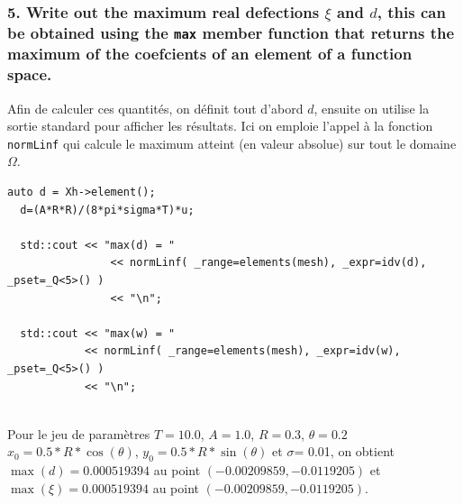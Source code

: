 \documentclass[a4paper,oneside,10pt]{report}
\begin{document}
\subsubsection{5. Write out the maximum real defections $\xi$ and $d$, this can be obtained using the \texttt{max} member function that
returns the maximum of the coefcients of an element of a function space.}

Afin de calculer ces quantités, on définit tout d'abord $d$, ensuite on utilise la sortie standard pour afficher les résultats. Ici on emploie l'appel à la fonction \texttt{normLinf} qui calcule le maximum atteint (en valeur absolue) sur tout le domaine $\Omega$.

\begin{center}
\begin{minipage}{\textwidth}
\begin{lstlisting}[label=code2,caption=membrane.cpp - definition de d]
  auto d = Xh->element();
  d=(A*R*R)/(8*pi*sigma*T)*u;

  std::cout << "max(d) = "
                << normLinf( _range=elements(mesh), _expr=idv(d), _pset=_Q<5>() )
                << "\n";
                
  std::cout << "max(w) = "
            << normLinf( _range=elements(mesh), _expr=idv(w), _pset=_Q<5>() )
            << "\n";  
      
\end{lstlisting}
\end{minipage}
\end{center}

Pour le jeu de paramètres $T=10.0$, $A = 1.0$, $R = 0.3$, $\theta = 0.2$ $x_0 = 0.5*R*\cos(\theta)$, $y_0 = 0.5*R*\sin(\theta)$ et $\sigma $= 0.01, on obtient
$\max(d) = 0.000519394$ au point $(-0.00209859,-0.0119205)$ et $\max(\xi) = 0.000519394$ au point $(-0.00209859,-0.0119205)$.
\end{document}
